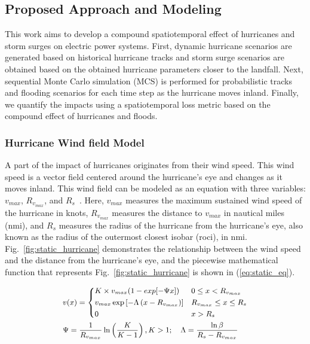 \subsection{Proposed Approach and Modeling}
This work aims to develop a compound spatiotemporal effect of hurricanes and storm surges on electric power systems. First, dynamic hurricane scenarios are generated based on historical hurricane tracks and storm surge scenarios are obtained based on the obtained hurricane parameters closer to the landfall. Next, sequential Monte Carlo simulation (MCS) is performed for probabilistic tracks and flooding scenarios for each time step as the hurricane moves inland. Finally, we quantify the impacts using a spatiotemporal loss metric based on the compound effect of hurricanes and floods.

\subsubsection{Hurricane Wind field Model}
A part of the impact of hurricanes originates from their wind speed. This wind speed is a vector field centered around the hurricane's eye and changes as it moves inland. This wind field can be modeled as an equation with three variables: $v_{max}$, $R_{v_{max}}$, and $R_s$~\cite{javanbakht2014risk, 9917119}. Here, $v_{max}$ measures the maximum sustained wind speed of the hurricane in knots, $R_{v_{max}}$ measures the distance to $v_{max}$ in nautical miles (nmi), and $R_s$ measures the radius of the hurricane from the hurricane's eye, also known as the radius of the outermost closest isobar (roci), in nmi. Fig.~\ref{fig:static_hurricane} demonstrates the relationship between the wind speed and the distance from the hurricane's eye, and the piecewise mathematical function that represents Fig.~\ref{fig:static_hurricane} is shown in (\ref{eq:static_eq}).

\begin{equation} \label{eq:static_eq}
\small
\begin{aligned}
&v(x)= \begin{dcases} K \times v_{max}(1-exp{[-\Psi x]}) & 0 \leq x<R_{v_{max}} \\
v_{max} \exp \left[- \Lambda \left(x-R_{v_{max}}\right)\right] & R_{v_{max}} \leq x \leq R_{s} \\
0 & x>R_{s}\end{dcases} \\
&\Psi=\frac{1}{R_{v_{max}}} \ln \left(\frac{K}{K-1}\right), K>1;
\quad \Lambda = \frac{\ln \beta}{R_{s}-R_{v_{max}}}
\end{aligned}
\end{equation}

